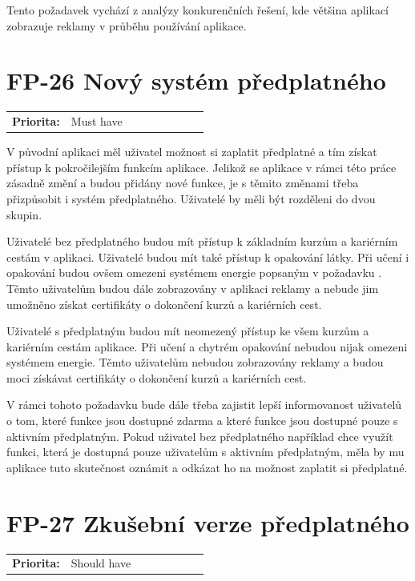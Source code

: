 Tento požadavek vychází z analýzy konkurenčních řešení, kde většina aplikací zobrazuje reklamy v průběhu používání aplikace.

\section{FP-26 Nový systém předplatného}\label{sec:fp-subscription-system}

\begin{tabular}{lp{0.7\linewidth}}
    \textbf{Priorita:} & Must have \\
\end{tabular}

V původní aplikaci měl uživatel možnost si zaplatit předplatné a tím získat přístup k pokročilejším funkcím aplikace. Jelikož se aplikace v rámci této práce zásadně změní a budou přidány nové funkce, je s těmito změnami třeba přizpůsobit i systém předplatného. Uživatelé by měli být rozděleni do dvou skupin.

Uživatelé bez předplatného budou mít přístup k základním kurzům a kariérním cestám v aplikaci. Uživatelé budou mít také přístup k opakování látky. Při učení i opakování budou ovšem omezeni systémem energie popsaným v požadavku . Těmto uživatelům budou dále zobrazovány v aplikaci reklamy a nebude jim umožněno získat certifikáty o dokončení kurzů a kariérních cest.

Uživatelé s předplatným budou mít neomezený přístup ke všem kurzům a kariérním cestám aplikace. Při učení a chytrém opakování nebudou nijak omezeni systémem energie. Těmto uživatelům nebudou zobrazovány reklamy a budou moci získávat certifikáty o dokončení kurzů a kariérních cest.

V rámci tohoto požadavku bude dále třeba zajistit lepší informovanost uživatelů o tom, které funkce jsou dostupné zdarma a které funkce jsou dostupné pouze s aktivním předplatným. Pokud uživatel bez předplatného například chce využít funkci, která je dostupná pouze uživatelům s aktivním předplatným, měla by mu aplikace tuto skutečnost oznámit a odkázat ho na možnost zaplatit si předplatné.

\section{FP-27 Zkušební verze předplatného}\label{sec:fp-free-trial}

\begin{tabular}{lp{0.7\linewidth}}
    \textbf{Priorita:} & Should have \\
\end{tabular}

